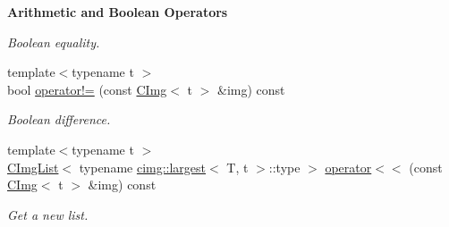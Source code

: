 \begin{Indent}{\bf Arithmetic and Boolean Operators}
\begin{DoxyCompactItemize}
\begin{DoxyCompactList}\small\item\em Boolean equality. \item\end{DoxyCompactList}\item 
\hypertarget{structcimg__library_1_1_c_img_a1c258cd12c9aa1fd13fa08887fd1d9fc}{
{\footnotesize template$<$typename t $>$ }\\bool \hyperlink{structcimg__library_1_1_c_img_a1c258cd12c9aa1fd13fa08887fd1d9fc}{operator!=} (const \hyperlink{structcimg__library_1_1_c_img}{CImg}$<$ t $>$ \&img) const }
\label{structcimg__library_1_1_c_img_a1c258cd12c9aa1fd13fa08887fd1d9fc}

\begin{DoxyCompactList}\small\item\em Boolean difference. \item\end{DoxyCompactList}\item 
\hypertarget{structcimg__library_1_1_c_img_a45c6cac66b9acc20ab807868517c5ee8}{
{\footnotesize template$<$typename t $>$ }\\\hyperlink{structcimg__library_1_1_c_img_list}{CImgList}$<$ typename \hyperlink{structcimg__library_1_1cimg_1_1largest}{cimg::largest}$<$ T, t $>$::type $>$ \hyperlink{structcimg__library_1_1_c_img_a45c6cac66b9acc20ab807868517c5ee8}{operator$<$$<$} (const \hyperlink{structcimg__library_1_1_c_img}{CImg}$<$ t $>$ \&img) const }
\label{structcimg__library_1_1_c_img_a45c6cac66b9acc20ab807868517c5ee8}

\begin{DoxyCompactList}\small\item\em Get a new list. \item\end{DoxyCompactList}\end{DoxyCompactItemize}
\end{Indent}

